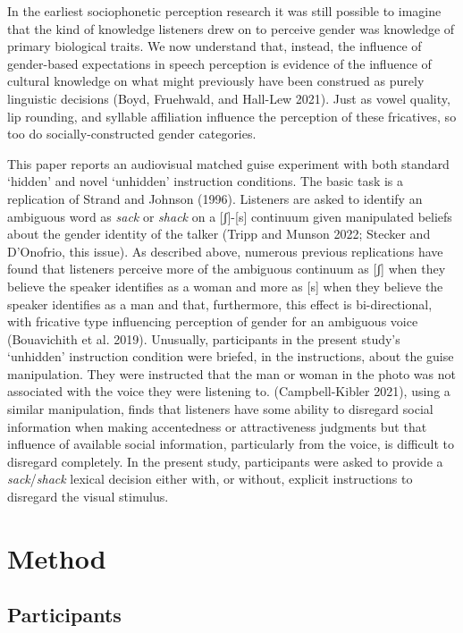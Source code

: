 \documentclass[
  letterpaper,
  DIV=11,
  numbers=noendperiod]{scrartcl}
\begin{document}
In the earliest sociophonetic perception research it was still possible
to imagine that the kind of knowledge listeners drew on to perceive
gender was knowledge of primary biological traits. We now understand
that, instead, the influence of gender-based expectations in speech
perception is evidence of the influence of cultural knowledge on what
might previously have been construed as purely linguistic decisions
(Boyd, Fruehwald, and Hall-Lew 2021). Just as vowel quality, lip
rounding, and syllable affiliation influence the perception of these
fricatives, so too do socially-constructed gender categories.

This paper reports an audiovisual matched guise experiment with both
standard `hidden' and novel `unhidden' instruction conditions. The basic
task is a replication of Strand and Johnson (1996). Listeners are asked
to identify an ambiguous word as \emph{sack} or \emph{shack} on a
{[}ʃ{]}-{[}s{]} continuum given manipulated beliefs about the gender
identity of the talker (Tripp and Munson 2022; Stecker and D'Onofrio,
this issue). As described above, numerous previous replications have
found that listeners perceive more of the ambiguous continuum as {[}ʃ{]}
when they believe the speaker identifies as a woman and more as {[}s{]}
when they believe the speaker identifies as a man and that, furthermore,
this effect is bi-directional, with fricative type influencing
perception of gender for an ambiguous voice (Bouavichith et al. 2019).
Unusually, participants in the present study's `unhidden' instruction
condition were briefed, in the instructions, about the guise
manipulation. They were instructed that the man or woman in the photo
was not associated with the voice they were listening to.
(Campbell-Kibler 2021), using a similar manipulation, finds that
listeners have some ability to disregard social information when making
accentedness or attractiveness judgments but that influence of available
social information, particularly from the voice, is difficult to
disregard completely. In the present study, participants were asked to
provide a \emph{sack}/\emph{shack} lexical decision either with, or
without, explicit instructions to disregard the visual stimulus.

\section{Method}\label{sec-method}

\subsection{Participants}\label{sub-participants}
\end{document}
